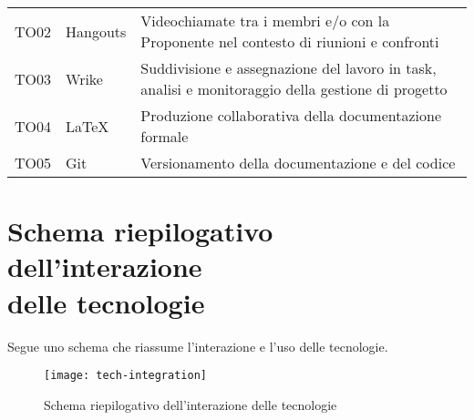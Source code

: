 \documentclass[./../Technology Baseline.tex]{subfiles}
\begin{document}
\begin{longtable}{| p{2cm} | p{3.5cm} |p{7cm} |}
	\newline TO02&
	\newline Hangouts&
	\newline Videochiamate tra i membri e/o con la Proponente nel contesto di riunioni e confronti \newline
	\\[1em]
	
	\newline TO03&
	\newline Wrike&
	\newline Suddivisione e assegnazione del lavoro in task, analisi e monitoraggio della gestione di progetto \newline
	\\[1em]
	
	\newline TO04&
	\newline LaTeX&
	\newline Produzione collaborativa della documentazione formale \newline
	\\[1em]
	
	\newline TO05&
	\newline Git&
	\newline Versionamento della documentazione e del codice \newline
	\\[1em]
	\hline
\end{longtable}

\section{Schema riepilogativo dell'interazione \\ delle tecnologie}

Segue uno schema che riassume l'interazione e l'uso delle tecnologie.

\begin{figure}
	\texttt{[image: tech-integration]}
	\centering
	\caption{Schema riepilogativo dell'interazione delle tecnologie}
\end{figure}
\end{document}
